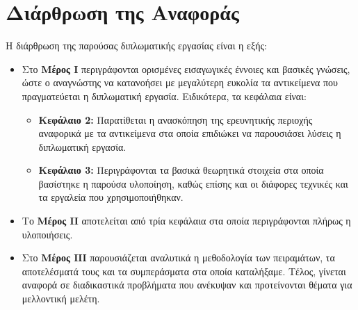 \section{Διάρθρωση της Αναφοράς}
\label{section:layout}

Η διάρθρωση της παρούσας διπλωματικής εργασίας είναι η εξής:

\begin{itemize}
  \item {Στο \textbf{Μέρος Ι} περιγράφονται ορισμένες εισαγωγικές έννοιες και
      βασικές γνώσεις, ώστε ο αναγνώστης να κατανοήσει με μεγαλύτερη ευκολία
      τα αντικείμενα που πραγματεύεται η διπλωματική εργασία.
      Ειδικότερα, τα κεφάλαια είναι:
      \begin{itemize}
        \item{\textbf{Κεφάλαιο 2:} Παρατίθεται η ανασκόπηση της ερευνητικής
            περιοχής αναφορικά με τα αντικείμενα στα οποία επιδιώκει να
            παρουσιάσει λύσεις η διπλωματική εργασία.
          }
        \item{\textbf{Κεφάλαιο 3:} Περιγράφονται τα βασικά θεωρητικά στοιχεία
            στα οποία βασίστηκε η παρούσα υλοποίηση, καθώς επίσης και οι
            διάφορες τεχνικές και τα εργαλεία που χρησιμοποιήθηκαν.
          }
      \end{itemize}
    }
  \item{Το \textbf{Μέρος ΙΙ} αποτελείται από τρία κεφάλαια στα οποία
      περιγράφονται πλήρως η υλοποιήσεις.
    }
  \item{Στο \textbf{Μέρος ΙΙΙ} παρουσιάζεται αναλυτικά η μεθοδολογία των
      πειραμάτων, τα αποτελέσματά τους και τα συμπεράσματα στα οποία καταλήξαμε.
      Τέλος, γίνεται αναφορά σε διαδικαστικά προβλήματα που ανέκυψαν
      και προτείνονται θέματα για μελλοντική μελέτη.
    }
\end{itemize}



